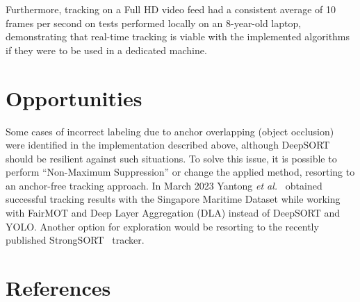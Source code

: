 \documentclass[a4paper,12pt]{article}
\begin{document}
\begin{multicols}{2}
Furthermore, tracking on a Full HD video feed had a consistent average of 10 frames per second on tests performed locally on an 8-year-old laptop, demonstrating that real-time tracking is viable with the implemented algorithms if they were to be used in a dedicated machine.

\section{Opportunities}\label{sec:opportunities}
Some cases of incorrect labeling due to anchor overlapping (object occlusion) were identified in the implementation described above, although DeepSORT should be resilient against such situations.
To solve this issue, it is possible to perform ``Non-Maximum Suppression'' or change the applied method, resorting to an anchor-free tracking approach.
In March 2023 Yantong \textit{et al.}~\cite{FAIRMOT} obtained successful tracking results with the Singapore Maritime Dataset while working with FairMOT and Deep Layer Aggregation (DLA) instead of DeepSORT and YOLO\@.
Another option for exploration would be resorting to the recently published StrongSORT~\cite{STRONGSORT} tracker.

\section{References}\label{sec:references}
\printbibliography[heading=none]
\end{multicols}
\end{document}
